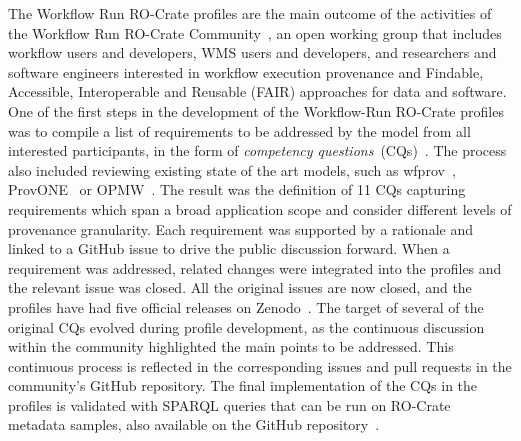 \documentclass[10pt,letterpaper]{article}
\begin{document}
The Workflow Run RO-Crate profiles are the main outcome of the activities of the Workflow Run RO-Crate Community~\cite{wrroc-site}, an open working group that includes workflow users and developers, WMS users and developers, and researchers and software engineers interested in workflow execution provenance and Findable, Accessible, Interoperable and Reusable (FAIR) approaches for data and software.
%
One of the first steps in the development of the Workflow-Run RO-Crate profiles was to compile a list of requirements to be addressed by the model from all interested participants, in the form of \textit{competency questions}~(CQs)~\cite{wrroc-cqs}.
%
The process also included reviewing existing state of the art models, such as wfprov~\cite{Belhajjame 2015}, ProvONE~\cite{Cuevas-Vicenttin 2016} or OPMW~\cite{Garijo 2011}. The result was the definition of 11 CQs capturing requirements which span a broad application scope and consider different levels of provenance granularity.
%
Each requirement was supported by a rationale and linked to a GitHub issue to drive the public discussion forward. When a requirement was addressed, related changes were integrated into the profiles and the relevant issue was closed. All the original issues are now closed, and the profiles have had five official releases on Zenodo~\cite{WRROC 2024a, WRROC 2024b, WRROC 2024c}.
%
The target of several of the original CQs evolved during profile development, as the continuous discussion within the community highlighted the main points to be addressed. This continuous process is reflected in the corresponding issues and pull requests in the community's GitHub repository. The final implementation of the CQs in the profiles is validated with SPARQL queries that can be run on RO-Crate metadata samples, also available on the GitHub repository~\cite{cqs-sparql-queries}.
\end{document}
